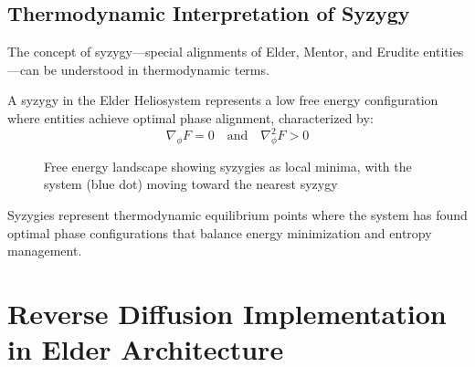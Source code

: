 \subsection{Thermodynamic Interpretation of Syzygy}

The concept of syzygy—special alignments of Elder, Mentor, and Erudite entities—can be understood in thermodynamic terms.

\begin{definition}
A syzygy in the Elder Heliosystem represents a low free energy configuration where entities achieve optimal phase alignment, characterized by:
\begin{equation}
\nabla_{\phi} F = 0 \quad \text{and} \quad \nabla^2_{\phi} F > 0
\end{equation}
\end{definition}

\begin{figure}[h]
\centering
{}
\caption{Free energy landscape showing syzygies as local minima, with the system (blue dot) moving toward the nearest syzygy}
\label{fig:free_energy_landscape}
\end{figure}

Syzygies represent thermodynamic equilibrium points where the system has found optimal phase configurations that balance energy minimization and entropy management.

\section{Reverse Diffusion Implementation in Elder Architecture}


